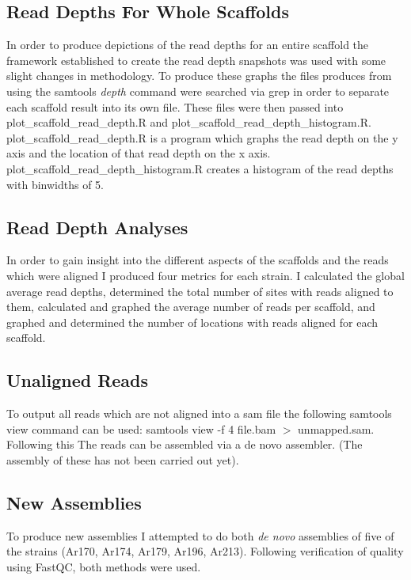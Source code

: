 \documentclass[12pt]{article}
\begin{document}
\subsection{Read Depths For Whole Scaffolds}
	In order to produce depictions of the read depths for an entire scaffold the framework established to create the read depth snapshots was used with some slight changes in methodology. To produce these graphs the files produces from using the samtools \textit{depth} command were searched via grep in order to separate each scaffold result into its own file. These files were then passed into plot\_scaffold\_read\_depth.R and plot\_scaffold\_read\_depth\_histogram.R. plot\_scaffold\_read\_depth.R is a program which graphs the read depth on the y axis and the location of that read depth on the x axis. plot\_scaffold\_read\_depth\_histogram.R creates a histogram of the read depths with binwidths of 5. %

\subsection{Read Depth Analyses}
	In order to gain insight into the different aspects of the scaffolds and the reads which were aligned I produced four metrics for each strain. I calculated the global average read depths, determined the total number of sites with reads aligned to them, calculated and graphed the average number of reads per scaffold, and graphed and determined the number of locations with reads aligned for each scaffold. 

\subsection{Unaligned Reads}
	To output all reads which are not aligned into a sam file the following samtools view command can be used: samtools view -f 4 file.bam $>$ unmapped.sam. Following this The reads can be assembled via a de novo assembler. (The assembly of these has not been carried out yet).

\subsection{New Assemblies}
	To produce new assemblies I attempted to do both \textit{de novo} assemblies of five of the strains (Ar170, Ar174, Ar179, Ar196, Ar213). Following verification of quality using FastQC, both methods were used.
\end{document}
